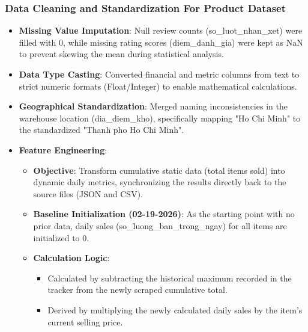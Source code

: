         \subsubsection{Data Cleaning and Standardization For Product Dataset}
        \begin{itemize}
            \item \textbf{Missing Value Imputation}: Null review counts (so\_luot\_nhan\_xet) were filled with 0, while missing rating scores (diem\_danh\_gia) were kept as NaN to prevent skewing the mean during statistical analysis.

            \item \textbf{Data Type Casting}: Converted financial and metric columns from text to strict numeric formats (Float/Integer) to enable mathematical calculations.

            \item \textbf{Geographical Standardization}: Merged naming inconsistencies in the warehouse location (dia\_diem\_kho), specifically mapping "Ho Chi Minh" to the standardized "Thanh pho Ho Chi Minh".

            \item \textbf{Feature Engineering}:
            \begin{itemize}
                \item \textbf{Objective}: Transform cumulative static data (total items sold) into dynamic daily metrics, synchronizing the results directly back to the source files (JSON and CSV).
                \item \textbf{Baseline Initialization (02-19-2026)}: As the starting point with no prior data, daily sales (so\_luong\_ban\_trong\_ngay) for all items are initialized to 0.
                \item \textbf{Calculation Logic}:
                \begin{itemize}
                    \item Calculated by subtracting the historical maximum recorded in the tracker from the newly scraped cumulative total.
                    \item Derived by multiplying the newly calculated daily sales by the item's current selling price.
                \end{itemize}
            \end{itemize}
        \end{itemize}

